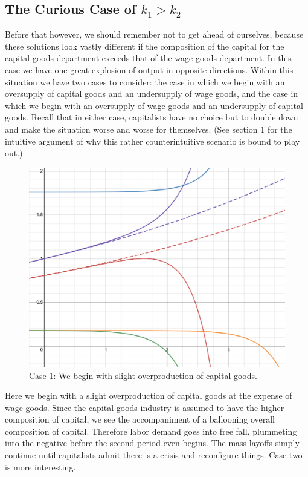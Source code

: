 \documentclass{article}
\theoremstyle{theorem}
\begin{document}
\subsection{The Curious Case of $k_1 > k_2$}
 Before that however, we should remember not to get ahead of ourselves, because these solutions look vastly different if the composition of the capital for the capital goods department exceeds that of the wage goods department. In this case we have one great explosion of output in opposite directions. Within this situation we have two cases to consider: the case in which we begin with an oversupply of capital goods and an undersupply of wage goods, and the case in which we begin with an oversupply of wage goods and an undersupply of capital goods. Recall that in either case, capitalists have no choice but to double down and make the situation worse and worse for themselves. (See section 1 for the intuitive argument of why this rather counterintuitive scenario is bound to play out.)
\begin{figure}[H]
\centering
\includegraphics[scale=.7]{Images/divergenceEZCase}
\caption{Case 1: We begin with slight overproduction of capital goods.}
\end{figure}
Here we begin with a slight overproduction of capital goods at the expense of wage goods. Since the capital goods industry is assumed to have the higher composition of capital, we see the accompaniment of a ballooning overall composition of capital. Therefore labor demand goes into free fall, plummeting into the negative before the second period even begins. The mass layoffs simply continue until capitalists admit there is a crisis and reconfigure things. Case two is more interesting.
\end{document}
